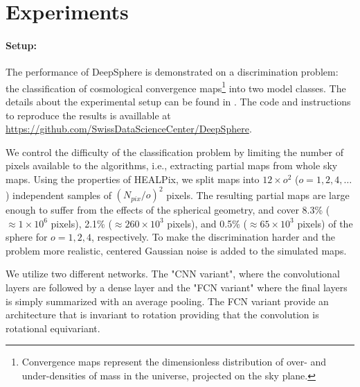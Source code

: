 \documentclass{article} %
\newcommand{\1}{\b{1}}              %
\newcommand{\0}{\b{0}}              %
\newcommand{\todo}[1]{{\color[rgb]{.6,.1,.6}{#1}}}
\begin{document}
\section{Experiments}


\paragraph{Setup:}
The performance of DeepSphere is demonstrated on a discrimination problem: the classification of cosmological convergence maps\footnote{Convergence maps represent the dimensionless distribution of over- and under-densities of mass in the universe, projected on the sky plane.} into two model classes. 
The details about the experimental setup can be found in \cite{perraudin2018deepsphere}. The code and instructions to reproduce the results is availlable at \url{https://github.com/SwissDataScienceCenter/DeepSphere}.

We control the difficulty of the classification problem by limiting the number of pixels available to the algorithms, i.e., extracting partial maps from whole sky maps.
Using the properties of HEALPix, we split maps into $12 \times o^2$ ($o=1,2,4,\dots$) independent samples of $(N_{pix} / o)^2$ pixels. The resulting partial maps are large enough to suffer from the effects of the spherical geometry, and cover 8.3\% ($\approx 1 \times 10^6$ pixels), 2.1\% ($\approx 260 \times 10^3$ pixels), and 0.5\% ($\approx 65 \times 10^3$ pixels) of the sphere for $o=1,2,4$, respectively.
To make the discrimination harder and the problem more realistic, centered Gaussian noise is added to the simulated maps.

We utilize two different networks. The "CNN variant", where the convolutional layers are followed by a dense layer and the "FCN variant" where the final layers is simply summarized with an average pooling. 
The FCN variant provide an architecture that is invariant to rotation providing that the convolution is rotational equivariant.
\end{document}
